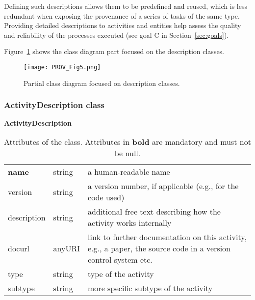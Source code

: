 Defining such descriptions allows them to be predefined and reused, which is less redundant when exposing the provenance of a series of tasks of the same type. 
Providing detailed descriptions to activities and entities help assess the quality and reliability of the processes executed (see goal C in Section~\ref{sec:goals}).

Figure~\ref{fig:classdiagram_descriptions} shows the class diagram part focused on the description classes. 

\begin{figure}[ht]
\centering
\texttt{[image: PROV\_Fig5.png]}
\caption[Partial class diagram focused on description classes.]{Partial class diagram focused on description classes.}
\label{fig:classdiagram_descriptions}
\end{figure}


\subsubsection{ActivityDescription class}
\label{sec:activity_desc}


\begin{table}[ht]
\small
{}\textwidth
\textbf{\normalsize ActivityDescription}\vspace{0.25em}\\
\begin{tabulary}{1.0\textwidth}{llL}
\toprule
{} &   & \\
\midrule
\textbf{name}         & string & a human-readable name\\
version      & string & a version number, if applicable (e.g., for the code used)\\
description  & string & additional free text describing how the activity works internally\\
docurl       & anyURI & link to further documentation on this activity, e.g., a
paper, the source code in a version control system etc.\\
type        & string & type of the activity\\
subtype     & string & more specific subtype of the activity\\
\bottomrule
\end{tabulary}
\caption[Attributes of the  class]{Attributes of the  class. Attributes in \textbf{bold} are mandatory and must not be null.
}\label{tab:activitydescription}
\end{table}


